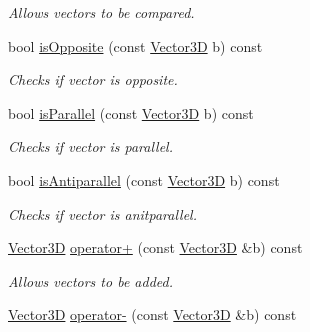\begin{DoxyCompactItemize}
\begin{DoxyCompactList}\small\item\em Allows vectors to be compared. \end{DoxyCompactList}\item 
\hypertarget{class_vector3_d_ac7c47cbae1aa443c138afc93daae815a}{bool \hyperlink{class_vector3_d_ac7c47cbae1aa443c138afc93daae815a}{is\+Opposite} (const \hyperlink{class_vector3_d}{Vector3\+D} b) const }\label{class_vector3_d_ac7c47cbae1aa443c138afc93daae815a}

\begin{DoxyCompactList}\small\item\em Checks if vector is opposite. \end{DoxyCompactList}\item 
\hypertarget{class_vector3_d_aa7318735a351a17f1c4108790e950303}{bool \hyperlink{class_vector3_d_aa7318735a351a17f1c4108790e950303}{is\+Parallel} (const \hyperlink{class_vector3_d}{Vector3\+D} b) const }\label{class_vector3_d_aa7318735a351a17f1c4108790e950303}

\begin{DoxyCompactList}\small\item\em Checks if vector is parallel. \end{DoxyCompactList}\item 
\hypertarget{class_vector3_d_a745d1d89cf74295a561e33db335a4f38}{bool \hyperlink{class_vector3_d_a745d1d89cf74295a561e33db335a4f38}{is\+Antiparallel} (const \hyperlink{class_vector3_d}{Vector3\+D} b) const }\label{class_vector3_d_a745d1d89cf74295a561e33db335a4f38}

\begin{DoxyCompactList}\small\item\em Checks if vector is anitparallel. \end{DoxyCompactList}\item 
\hypertarget{class_vector3_d_a7d46b011b385bfaf111e9fbba99aa89b}{\hyperlink{class_vector3_d}{Vector3\+D} \hyperlink{class_vector3_d_a7d46b011b385bfaf111e9fbba99aa89b}{operator+} (const \hyperlink{class_vector3_d}{Vector3\+D} \&b) const }\label{class_vector3_d_a7d46b011b385bfaf111e9fbba99aa89b}

\begin{DoxyCompactList}\small\item\em Allows vectors to be added. \end{DoxyCompactList}\item 
\hypertarget{class_vector3_d_a5a871906d907637c0f8f22a01430e118}{\hyperlink{class_vector3_d}{Vector3\+D} \hyperlink{class_vector3_d_a5a871906d907637c0f8f22a01430e118}{operator-\/} (const \hyperlink{class_vector3_d}{Vector3\+D} \&b) const }\label{class_vector3_d_a5a871906d907637c0f8f22a01430e118}


\end{DoxyCompactItemize}
